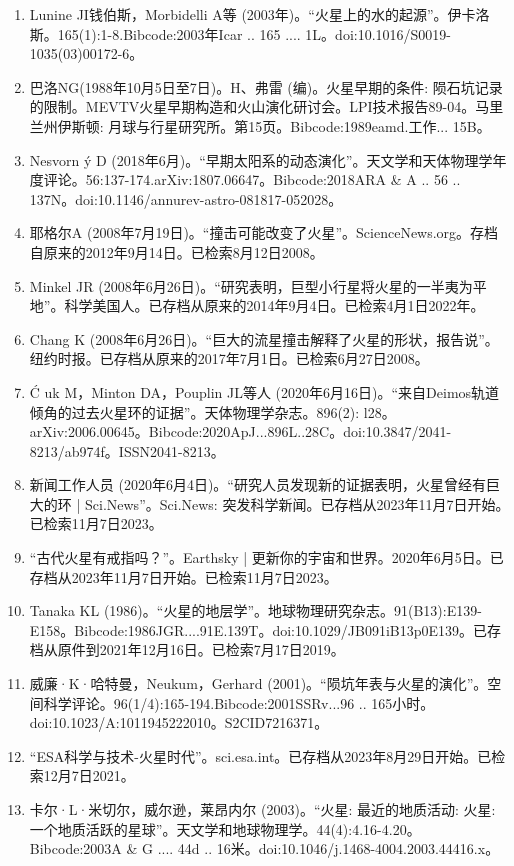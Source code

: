 \begin{enumerate}
\item Lunine JI钱伯斯，Morbidelli A等 (2003年)。“火星上的水的起源”。伊卡洛斯。165(1):1-8.Bibcode:2003年Icar .. 165 .... 1L。doi:10.1016/S0019-1035(03)00172-6。
\item 巴洛NG(1988年10月5日至7日)。H、弗雷 (编)。火星早期的条件: 陨石坑记录的限制。MEVTV火星早期构造和火山演化研讨会。LPI技术报告89-04。马里兰州伊斯顿: 月球与行星研究所。第15页。Bibcode:1989eamd.工作... 15B。
\item Nesvorn ý D (2018年6月)。“早期太阳系的动态演化”。天文学和天体物理学年度评论。56:137-174.arXiv:1807.06647。Bibcode:2018ARA & A .. 56 .. 137N。doi:10.1146/annurev-astro-081817-052028。
\item 耶格尔A (2008年7月19日)。“撞击可能改变了火星”。ScienceNews.org。存档自原来的2012年9月14日。已检索8月12日2008。
\item Minkel JR (2008年6月26日)。“研究表明，巨型小行星将火星的一半夷为平地”。科学美国人。已存档从原来的2014年9月4日。已检索4月1日2022年。
\item Chang K (2008年6月26日)。“巨大的流星撞击解释了火星的形状，报告说”。纽约时报。已存档从原来的2017年7月1日。已检索6月27日2008。
\item Ć uk M，Minton DA，Pouplin JL等人 (2020年6月16日)。“来自Deimos轨道倾角的过去火星环的证据”。天体物理学杂志。896(2): l28。arXiv:2006.00645。Bibcode:2020ApJ...896L..28C。doi:10.3847/2041-8213/ab974f。ISSN2041-8213。 
\item 新闻工作人员 (2020年6月4日)。“研究人员发现新的证据表明，火星曾经有巨大的环 | Sci.News”。Sci.News: 突发科学新闻。已存档从2023年11月7日开始。已检索11月7日2023。
\item “古代火星有戒指吗？”。Earthsky | 更新你的宇宙和世界。2020年6月5日。已存档从2023年11月7日开始。已检索11月7日2023。
\item Tanaka KL (1986)。“火星的地层学”。地球物理研究杂志。91(B13):E139-E158。Bibcode:1986JGR....91E.139T。doi:10.1029/JB091iB13p0E139。已存档从原件到2021年12月16日。已检索7月17日2019。
\item 威廉·K·哈特曼，Neukum，Gerhard (2001)。“陨坑年表与火星的演化”。空间科学评论。96(1/4):165-194.Bibcode:2001SSRv...96 .. 165小时。doi:10.1023/A:1011945222010。S2CID7216371。 
\item “ESA科学与技术-火星时代”。sci.esa.int。已存档从2023年8月29日开始。已检索12月7日2021。
\item 卡尔·L·米切尔，威尔逊，莱昂内尔 (2003)。“火星: 最近的地质活动: 火星: 一个地质活跃的星球”。天文学和地球物理学。44(4):4.16-4.20。Bibcode:2003A & G .... 44d .. 16米。doi:10.1046/j.1468-4004.2003.44416.x。

\end{enumerate}
